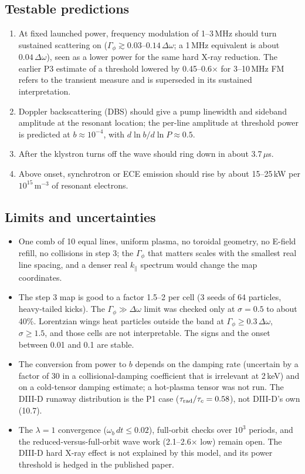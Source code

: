 \documentclass[10pt,a4paper]{article}
\begin{document}
\subsection{Testable predictions}
\begin{enumerate}
\item At fixed launched power, frequency modulation of 1--3\,MHz should turn sustained scattering on ($\Gamma_\phi\gtrsim0.03$--$0.14\,\Delta\omega$; a 1\,MHz equivalent is about $0.04\,\Delta\omega$), seen as a lower power for the same hard X-ray reduction. The earlier P3 estimate of a threshold lowered by 0.45--0.6$\times$ for 3--10\,MHz FM refers to the transient measure and is superseded in its sustained interpretation.
\item Doppler backscattering (DBS) should give a pump linewidth and sideband amplitude at the resonant location; the per-line amplitude at threshold power is predicted at $b\approx10^{-4}$, with $d\ln b/d\ln P\approx0.5$.
\item After the klystron turns off the wave should ring down in about 3.7\,$\mu$s.
\item Above onset, synchrotron or ECE emission should rise by about 15--25\,kW per $10^{15}$\,m$^{-3}$ of resonant electrons.
\end{enumerate}

\subsection{Limits and uncertainties}
\begin{itemize}
\item One comb of 10 equal lines, uniform plasma, no toroidal geometry, no E-field refill, no collisions in step 3; the $\Gamma_\phi$ that matters scales with the smallest real line spacing, and a denser real $k_\parallel$ spectrum would change the map coordinates.
\item The step 3 map is good to a factor 1.5--2 per cell (3 seeds of 64 particles, heavy-tailed kicks). The $\Gamma_\phi\gg\Delta\omega$ limit was checked only at $\sigma=0.5$ to about 40\%. Lorentzian wings heat particles outside the band at $\Gamma_\phi\ge0.3\,\Delta\omega$, $\sigma\ge1.5$, and those cells are not interpretable. The signs and the onset between 0.01 and 0.1 are stable.
\item The conversion from power to $b$ depends on the damping rate (uncertain by a factor of 30 in a collisional-damping coefficient that is irrelevant at 2\,keV) and on a cold-tensor damping estimate; a hot-plasma tensor was not run. The DIII-D runaway distribution is the P1 case ($\tau_{\rm rad}/\tau_c=0.58$), not DIII-D's own (10.7).
\item The $\lambda=1$ convergence ($\omega_b\,dt\le0.02$), full-orbit checks over $10^3$ periods, and the reduced-versus-full-orbit wave work (2.1--2.6$\times$ low) remain open. The DIII-D hard X-ray effect is not explained by this model, and its power threshold is hedged in the published paper.
\end{itemize}
\end{document}
